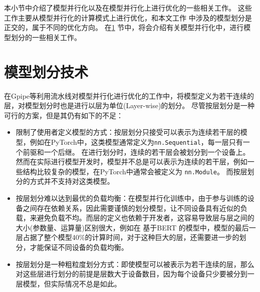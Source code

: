 本小节中介绍了模型并行化以及在模型并行化上进行优化的一些相关工作。
这些工作主要从模型并行化的计算模式上进行优化，和本文工作\sys{} 中涉及的模型划分是正交的，属于不同的优化方向。
在\ref{sec:partition} 节中，将会介绍有关模型并行化中，进行模型划分的一些相关工作。


\section{模型划分技术}
\label{sec:partition}

在Gpipe等利用流水线对模型并行化进行优化的工作中，将模型定义为若干连续的层，对模型划分时也是进行以层为单位(Layer-wise)的划分。
尽管按层划分是一种可行的方案，但是其仍有如下的不足：
\begin{itemize}
	\item 限制了使用者定义模型的方式：按层划分只接受可以表示为连续若干层的模型，例如在PyTorch中，这类模型通常定义为\texttt{nn.Sequential}，每一层只有一个前驱和一个后继。
	在进行划分时，连续的若干层会被划分到一个设备上。
	然而在实际进行模型开发时，模型并不总是可以表示为连续的若干层，例如一些结构比较复杂的模型，在PyTorch中通常会被定义为 \texttt{nn.Module}。
	而按层划分的方式并不支持对这类模型。
	\item 按层划分难以达到最优的负载均衡：在模型并行化训练中，由于参与训练的设备之间存在依赖关系，因此需要谨慎的划分模型，让不同设备具有近似的负载，来避免负载不均。而层的定义也依赖于开发者，这容易导致层与层之间的大小(参数量、运算量)区别很大，例如在 基于BERT 的模型中，模型的最后一层占据了整个模型40\%的计算时间，对于这种巨大的层，还需要进一步的划分，才能保证不同设备的负载均衡。
	\item 按层划分是一种粗粒度划分方式：即使模型可以被表示为若干连续的层，那么对这些层进行划分的前提是层数大于设备数目，因为每个设备只少要被分到一层模型，但实际情况不总是如此。
\end{itemize}

